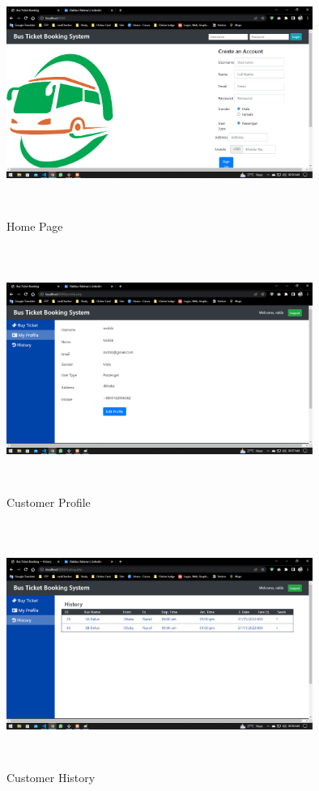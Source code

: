 \documentclass[runningheads]{llncs}
\begin{document}
\begin{figure}[h]
    \centering
    \includegraphics[width=10cm,height=8cm]{img/homepage.png}
    \caption{Home Page}
    \label{fig:my_label}
\end{figure}
\begin{figure}[h]
    \centering
    \includegraphics[width=10cm,height=8cm]{img/customer profile.png}
    \caption{Customer Profile}
    \label{fig:my_label}
\end{figure}
\begin{figure}[h]
    \centering
    \includegraphics[width=10cm,height=8cm]{img/customer history.png}
    \caption{Customer History}
    \label{fig:my_label}
\end{figure}
\end{document}
